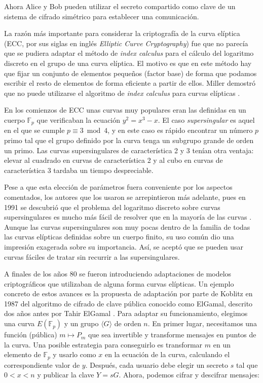 \documentclass[
  a4paper,
  12pt,
  spanish,
]{scrartcl}
\begin{document}
Ahora Alice y Bob pueden utilizar el secreto compartido como clave de un sistema de cifrado simétrico para establecer una comunicación.

La razón más importante para considerar la criptografía de la curva elíptica (ECC, por sus siglas en inglés \textit{Elliptic Curve Cryptography}) fue que no parecía que se pudiera adaptar el método de \textit{index calculus} para el cálculo del logaritmo discreto en el grupo de una curva elíptica. El motivo es que en este método hay que fijar un conjunto de elementos pequeños (factor base) de forma que podamos escribir el resto de elementos de forma eficiente a partir de ellos. Miller demostró que no puede utilizarse el algoritmo de \textit{index calculus} para curvas elípticas \parencite{williams_use_1986}.

En los comienzos de ECC unas curvas muy populares eran las definidas en un cuerpo $\mathbb{F}_p$ que verificaban la ecuación $y^2 = x^3 - x$. El caso \textit{supersingular} es aquel en el que se cumple $p \equiv 3 \bmod 4$, y en este caso es rápido encontrar un número $p$ primo tal que el grupo definido por la curva tenga un subgrupo grande de orden un primo. Las curvas supersingulares de característica 2 y 3 tenían otra ventaja: elevar al cuadrado en curvas de característica 2 y al cubo en curvas de característica 3 tardaba un tiempo despreciable.

Pese a que esta elección de parámetros fuera conveniente por los aspectos comentados, los autores que los usaron se arrepintieron más adelante, pues en 1991 se descubrió que el problema del logaritmo discreto sobre curvas supersingulares es mucho más fácil de resolver que en la mayoría de las curvas \parencite[785]{koblitz_elliptic_2011}. Aunque las curvas supersingulares son muy pocas dentro de la familia de todas las curvas elípticas definidas sobre un cuerpo finito, su uso común dio una impresión exagerada sobre su importancia. Así, se aceptó que se pueden usar curvas fáciles de tratar sin recurrir a las supersingulares.

A finales de los años 80 se fueron introduciendo adaptaciones de modelos criptográficos que utilizaban de alguna forma curvas elípticas. Un ejemplo concreto de estos avances es la propuesta de adaptación por parte de Koblitz en 1987 \parencite{koblitz_elgamal_1987} del algoritmo de cifrado de clave pública conocido como ElGamal, descrito dos años antes por Tahir ElGamal \parencite{elgamal_cryptosytem_1985}. Para adaptar su funcionamiento, elegimos una curva $E(\mathbb{F}_p)$ y un grupo $\langle G \rangle$ de orden $n$. En primer lugar, necesitamos una función (pública) $m \mapsto P_m$ que sea invertible y transforme mensajes en puntos de la curva. Una posible estrategia para conseguirlo es transformar $m$ en un elemento de $\mathbb{F}_p$ y usarlo como $x$ en la ecuación de la curva, calculando el correspondiente valor de $y$. Después, cada usuario debe elegir un secreto \(s\) tal que $0 < x < n$ y publicar la clave $Y = sG$. Ahora, podemos cifrar y descifrar mensajes:
    
\end{document}
